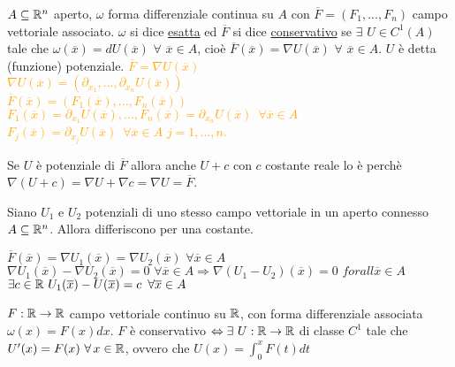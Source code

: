 \begin{definition}
	$A \subseteq \mathbb{R}^n$ aperto, $\omega$ forma differenziale continua su $A$ con $\overline{F}=(F_1,...,F_n)$ campo vettoriale associato. $\omega$ si dice \underline{esatta} ed $\overline{F}$ si dice \underline{conservativo} se $\exists \,\,U \in  C^1(A)$ tale che $\omega(\overline{x})=dU(\overline{x})\,\, \forall\,\, \overline{x} \in A$, cioè $\overline{F}(\overline{x})=\nabla U(\overline{x})\,\, \forall\,\, \overline{x}\in A$. $U $ è detta (funzione) potenziale. 
	\textcolor{orange}{$\overline{F} = \nabla U(\overline{x})$\\
	$\nabla U(\overline{x})=(\partial_{x_1},..., \partial_{x_n}U(\overline{x}))$\\
	$\overline{F}(\overline{x})=(F_1(\overline{x}),...,F_n(\overline{x}))$\\
	$F_1(\overline{x}) =\partial_{x_1}U(\overline{x}),..., F_n(\overline{x})=\partial_{x_n} U(\overline{x})\,\,\, \forall \overline{x}\in A$\\
	$F_j(\overline{x})=\partial_{x_j}U(\overline{x})\,\,\, \forall \overline{x}\in A\,\, j=1,...,n$.}
\end{definition}
	

\begin{attbar}
	Se $U$ è potenziale di $\overline{F}$ allora anche $U+c$ con $c$ costante reale lo è perchè $\nabla (U+c)=\nabla U+\nabla c= \nabla U = \overline{F}$.
\end{attbar}


\begin{attbar}
	Siano $U_1$ e $U_2$ potenziali di uno stesso campo vettoriale in un aperto connesso $A \subseteq \mathbb{R}^n$. Allora differiscono per una costante.
\end{attbar}


\begin{exbar}
	$\overline{F} (\overline{x})=\nabla U_1 (\overline{x})=\nabla U_2(\overline{x})\,\, \forall \overline{x}\in A $\\
	$\nabla U_1(\overline{x})-\nabla U_2(\overline{x})=0\,\,\forall \overline{x}\in A \Rightarrow \nabla(U_1-U_2)(\overline{x})=0 \,\, forall \overline{x}\in A$\\
	$\exists c \in \mathbb{R} \,\, U_1(\overline{x}) - U(\overline{x}) = c \,\,\, \forall \overline{x}\in A$
\end{exbar}
	
	
$F:\mathbb{R}\rightarrow \mathbb{R}$ campo vettoriale continuo su $\mathbb{R}$, con forma differenziale associata $\omega(x)=F(x)dx$. $F$ è conservativo $\Leftrightarrow \exists \,\, U : \mathbb{R} \rightarrow \mathbb{R}$ di classe $C^1$ tale che $U'(x)=F(x)\,\, \forall \, x \in \mathbb{R}$, ovvero che $U(x)=\int_0^xF(t)dt$

